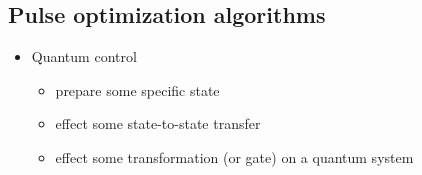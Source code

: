 \documentclass{article}
\begin{document}
\subsection{Pulse optimization algorithms}
\begin{itemize}
    \item Quantum control
        \begin{itemize}
            \item prepare some specific state
            \item effect some state-to-state transfer
            \item effect some transformation (or gate) on a quantum system
        \end{itemize} 
\end{itemize}

\end{document}

